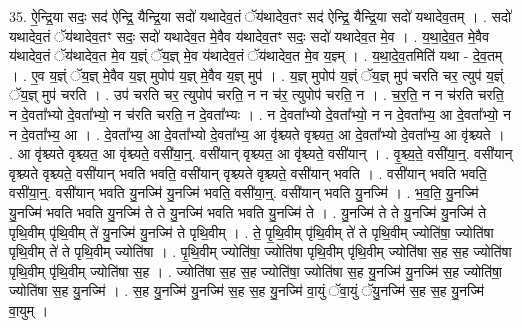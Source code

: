 \documentclass[17pt]{extarticle}
\begin{document}
35. ऐ॒न्द्रि॒या सदः॒ सद॑ ऐन्द्रि॒ यैन्द्रि॒या सदो॑ यथादेव॒तं ॅय॑थादेव॒तꣳ सद॑ ऐन्द्रि॒ यैन्द्रि॒या सदो॑ यथादेव॒तम् । . सदो॑ यथादेव॒तं ॅय॑थादेव॒तꣳ सदः॒ सदो॑ यथादेव॒त मे॒वैव य॑थादेव॒तꣳ सदः॒ सदो॑ यथादेव॒त मे॒व । . य॒था॒दे॒व॒त मे॒वैव य॑थादेव॒तं ॅय॑थादेव॒त मे॒व य॒ज्ञ्ं ॅय॒ज्ञ् मे॒व य॑थादेव॒तं ॅय॑थादेव॒त मे॒व य॒ज्ञ्म् । . य॒था॒दे॒व॒तमिति॑ यथा - दे॒व॒तम् । . ए॒व य॒ज्ञ्ं ॅय॒ज्ञ् मे॒वैव य॒ज्ञ् मुपोप॑ य॒ज्ञ् मे॒वैव य॒ज्ञ् मुप॑ । . य॒ज्ञ् मुपोप॑ य॒ज्ञ्ं ॅय॒ज्ञ् मुप॑ चरति चर॒ त्युप॑ य॒ज्ञ्ं ॅय॒ज्ञ् मुप॑ चरति । . उप॑ चरति चर॒ त्युपोप॑ चरति॒ न न च॑र॒ त्युपोप॑ चरति॒ न । . च॒र॒ति॒ न न च॑रति चरति॒ न दे॒वता᳚भ्यो दे॒वता᳚भ्यो॒ न च॑रति चरति॒ न दे॒वता᳚भ्यः । . न दे॒वता᳚भ्यो दे॒वता᳚भ्यो॒ न न दे॒वता᳚भ्य॒ आ दे॒वता᳚भ्यो॒ न न दे॒वता᳚भ्य॒ आ । . दे॒वता᳚भ्य॒ आ दे॒वता᳚भ्यो दे॒वता᳚भ्य॒ आ वृ॑श्च्यते वृश्च्यत॒ आ दे॒वता᳚भ्यो दे॒वता᳚भ्य॒ आ वृ॑श्च्यते । . आ वृ॑श्च्यते वृश्च्यत॒ आ वृ॑श्च्यते॒ वसी॑या॒न्॒. वसी॑यान् वृश्च्यत॒ आ वृ॑श्च्यते॒ वसी॑यान् । . वृ॒श्च्य॒ते॒ वसी॑या॒न्॒. वसी॑यान् वृश्च्यते वृश्च्यते॒ वसी॑यान् भवति भवति॒ वसी॑यान् वृश्च्यते वृश्च्यते॒ वसी॑यान् भवति । . वसी॑यान् भवति भवति॒ वसी॑या॒न्॒. वसी॑यान् भवति यु॒नज्मि॑ यु॒नज्मि॑ भवति॒ वसी॑या॒न्॒. वसी॑यान् भवति यु॒नज्मि॑ । . भ॒व॒ति॒ यु॒नज्मि॑ यु॒नज्मि॑ भवति भवति यु॒नज्मि॑ ते ते यु॒नज्मि॑ भवति भवति यु॒नज्मि॑ ते । . यु॒नज्मि॑ ते ते यु॒नज्मि॑ यु॒नज्मि॑ ते पृथि॒वीम् पृ॑थि॒वीम् ते॑ यु॒नज्मि॑ यु॒नज्मि॑ ते पृथि॒वीम् । . ते॒ पृ॒थि॒वीम् पृ॑थि॒वीम् ते॑ ते पृथि॒वीम् ज्योति॑षा॒ ज्योति॑षा पृथि॒वीम् ते॑ ते पृथि॒वीम् ज्योति॑षा । . पृ॒थि॒वीम् ज्योति॑षा॒ ज्योति॑षा पृथि॒वीम् पृ॑थि॒वीम् ज्योति॑षा स॒ह स॒ह ज्योति॑षा पृथि॒वीम् पृ॑थि॒वीम् ज्योति॑षा स॒ह । . ज्योति॑षा स॒ह स॒ह ज्योति॑षा॒ ज्योति॑षा स॒ह यु॒नज्मि॑ यु॒नज्मि॑ स॒ह ज्योति॑षा॒ ज्योति॑षा स॒ह यु॒नज्मि॑ । . स॒ह यु॒नज्मि॑ यु॒नज्मि॑ स॒ह स॒ह यु॒नज्मि॑ वा॒युं ॅवा॒युं ॅयु॒नज्मि॑ स॒ह स॒ह यु॒नज्मि॑ वा॒युम् । \newline
\end{document}
